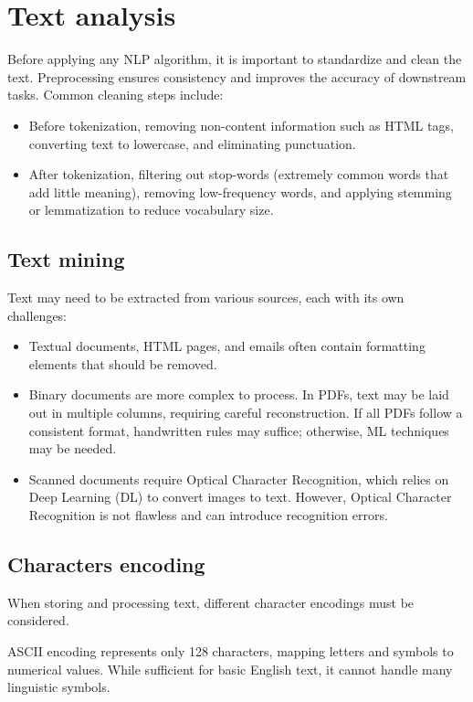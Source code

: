 \section{Text analysis}

Before applying any NLP algorithm, it is important to standardize and clean the text. 
Preprocessing ensures consistency and improves the accuracy of downstream tasks.
Common cleaning steps include:
\begin{itemize}
    \item Before tokenization, removing non-content information such as HTML tags, converting text to lowercase, and eliminating punctuation.
    \item After tokenization, filtering out stop-words (extremely common words that add little meaning), removing low-frequency words, and applying stemming or lemmatization to reduce vocabulary size. 
\end{itemize}

\subsection{Text mining}
Text may need to be extracted from various sources, each with its own challenges: 
\begin{itemize}
    \item Textual documents, HTML pages, and emails often contain formatting elements that should be removed. 
    \item Binary documents are more complex to process. 
        In PDFs, text may be laid out in multiple columns, requiring careful reconstruction. 
        If all PDFs follow a consistent format, handwritten rules may suffice; otherwise, ML techniques may be needed.
    \item Scanned documents require Optical Character Recognition, which relies on Deep Learning (DL) to convert images to text. 
        However, Optical Character Recognition is not flawless and can introduce recognition errors.
\end{itemize}

\subsection{Characters encoding}
When storing and processing text, different character encodings must be considered.

ASCII encoding represents only 128 characters, mapping letters and symbols to numerical values. 
While sufficient for basic English text, it cannot handle many linguistic symbols.


